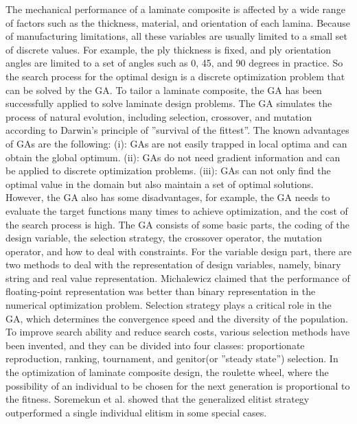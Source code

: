 The mechanical performance of a laminate composite is affected by a wide range of factors such as the
thickness, material, and orientation of each lamina. Because of manufacturing limitations, all these
variables are usually limited to a small set of discrete values. For example, the ply thickness is fixed,
and ply orientation angles are limited to a set of angles such as 0, 45, and 90 degrees in practice. So
the search process for the optimal design is a discrete optimization problem that can be solved by the
GA. To tailor a laminate composite, the GA has been successfully applied to solve laminate design
problems\cite{riche1993optimization,nagendra1996improved,sadagopan1998application,todoroki1998stacking,liu2000permutation,sivakumar1998optimum,walker2003technique,lin2004stacking,kang2005minimum,murugan2007target,akbulut2008optimum}.
The GA simulates the process of natural evolution, including selection, crossover, and mutation
according to Darwin's principle of ''survival of the fittest''. The known advantages of GAs are the
following: (i): GAs are not easily trapped in local optima and can obtain the global
optimum. (ii): GAs do not need gradient information and can be applied to discrete optimization
problems. (iii): GAs can not only find the optimal value in the domain but also maintain a
set of optimal solutions. However, the GA also has some disadvantages, for example, the GA
needs to evaluate the target functions many times to achieve optimization, and the cost of the
search process is high. The GA consists of some basic parts, the coding of the design variable,
the selection strategy, the crossover operator, the mutation operator, and how to deal with constraints. For the
variable design part, there are two methods to deal with the representation of design variables, namely,
binary string and real value representation\cite{riche1993optimization,todoroki1998stacking}.
Michalewicz\cite{zbigniew1996genetic} claimed that the performance of floating-point representation was
better than binary representation in the numerical optimization problem. Selection strategy plays a
critical role in the GA, which determines the convergence speed and the diversity of the population. To
improve search ability and reduce search costs, various selection methods have been invented, and they
can be divided into four classes: proportionate reproduction, ranking, tournament, and
genitor(or ''steady state'') selection. In the optimization of laminate composite design, the roulette
wheel\cite{riche1993optimization,seresta2007optimal}, where the possibility of an individual to be
chosen for the next generation is proportional to the fitness.
Soremekun et al.\cite{soremekun2001composite} showed that the generalized elitist strategy outperformed a
single individual elitism in some special cases.

